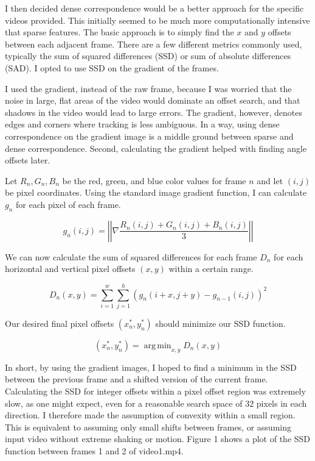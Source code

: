 \documentclass{article}
\DeclareMathOperator*{\argmin}{arg\,min}
\begin{document}
I then decided dense correspondence would be a better approach for the specific videos provided. This initially seemed to be much more computationally intensive that sparse features. The basic approach is to simply find the $x$ and $y$ offsets between each adjacent frame. There are a few different metrics commonly used, typically the sum of squared differences (SSD) or sum of absolute differences (SAD). I opted to use SSD on the gradient of the frames. 

I used the gradient, instead of the raw frame, because I was worried that the noise in large, flat areas of the video would dominate an offset search, and that shadows in the video would lead to large errors. The gradient, however, denotes edges and corners where tracking is less ambiguous. In a way, using dense correspondence on the gradient image is a middle ground between sparse and dense correspondence. Second, calculating the gradient helped with finding angle offsets later.

Let $R_n,G_n,B_n$ be the red, green, and blue color values for frame $n$ and let $(i,j)$ be pixel coordinates. Using the standard image gradient function, I can calculate $g_n$ for each pixel of each frame.

\begin{equation}
g_n(i,j) = \left |\left |\nabla \frac{R_n(i,j) + G_n(i,j) + B_n(i,j)}{3}\right|\right|
\end{equation}

We can now calculate the sum of squared differences for each frame $D_n$ for each horizontal and vertical pixel offsets $(x,y)$ within a certain range.

\begin{equation}
D_n(x,y) = \sum_{i=1}^w \sum_{j=1}^h (g_n(i+x,j+y)-g_{n-1}(i,j))^2
\end{equation}

Our desired final pixel offsets $(x^*_n,y^*_n)$ should minimize our SSD function.

\begin{equation}
(x^*_n,y^*_n) = \argmin_{x,y} D_n(x,y)
\end{equation}

In short, by using the gradient images, I hoped to find a minimum in the SSD between the previous frame and a shifted version of the current frame. Calculating the SSD for integer offsets within a pixel offset region was extremely slow, as one might expect, even for a reasonable search space of $32$ pixels in each direction. I therefore made the assumption of convexity within a small region. This is equivalent to assuming only small shifts between frames, or assuming input video without extreme shaking or motion. Figure 1 shows a plot of the SSD function between frames 1 and 2 of video1.mp4.
\end{document}
